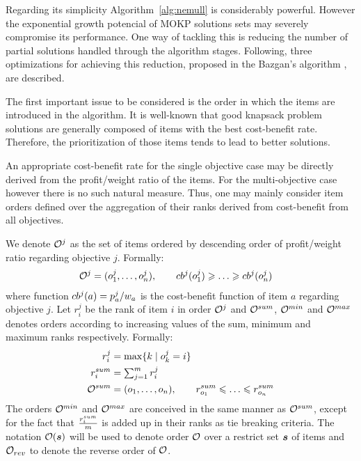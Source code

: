 Regarding its simplicity Algorithm~\ref{alg:nemull} is considerably powerful.
However the exponential growth potencial of MOKP solutions sets
may severely compromise its performance.
One way of tackling this is reducing the number of partial solutions
handled through the algorithm stages.
Following, three optimizations for achieving this  reduction, proposed in the
Bazgan's algorithm  \cite{bazgan2009}, are described.

\label{subsec:order}
The first important issue to be considered is the order
in which the items are introduced in the algorithm.
It is well-known that good knapsack problem solutions
are generally composed of items with the best cost-benefit rate.
Therefore, the prioritization of those items tends to lead to better solutions.

An appropriate cost-benefit rate for the single objective case may be directly derived
from the profit/weight ratio of the items.
For the multi-objective case however there is no such natural measure.
Thus, one may mainly consider item orders defined over the aggregation of their ranks
derived from cost-benefit from all objectives.

We denote $\mathcal{O}^j$ as the set of items ordered by descending order of profit/weight
ratio regarding objective $j$.
Formally:
\begin{align*}
  \mathcal{O}^j &= (o^j_1, \ldots, o^j_n) , \qquad cb^{j}(o^j_1) \geqslant \ldots \geqslant cb^{j}(o^j_n)
\end{align*}
where function $cb^{j}(a) = {p^j_a}/{w_a}$ is the
cost-benefit function of item $a$ regarding objective $j$.
Let $r^j_i$ be the rank of item $i$ in order $\mathcal{O}^j$ and
$\mathcal{O}^{sum}$, $\mathcal{O}^{min}$ and $\mathcal{O}^{max}$ denotes orders according to increasing
values of the sum, minimum and maximum ranks respectively.
Formally:
\begin{align*}
  r^j_i &= \max\{ k \;|\; o^j_k = i \} \\
  r^{sum}_i &= \textstyle\sum^m_{j=1} r^j_i \\
  \mathcal{O}^{sum} &= (o_1, \ldots, o_n) , \qquad r^{sum}_{o_1} \leqslant \ldots \leqslant r^{sum}_{o_n}
\end{align*}
The orders $\mathcal{O}^{min}$ and $\mathcal{O}^{max}$ are conceived in the same manner as
$\mathcal{O}^{sum}$, except for the fact that $\frac{r^{sum}_i}{m}$ is added up
in their ranks as tie breaking criteria.
The notation $\mathcal{O}(\boldsymbol{s})$ will be used to denote order $\mathcal{O}$
over a restrict set $\boldsymbol{s}$ of items and $\mathcal{O}_{rev}$ to denote the reverse
order of $\mathcal{O}$.

